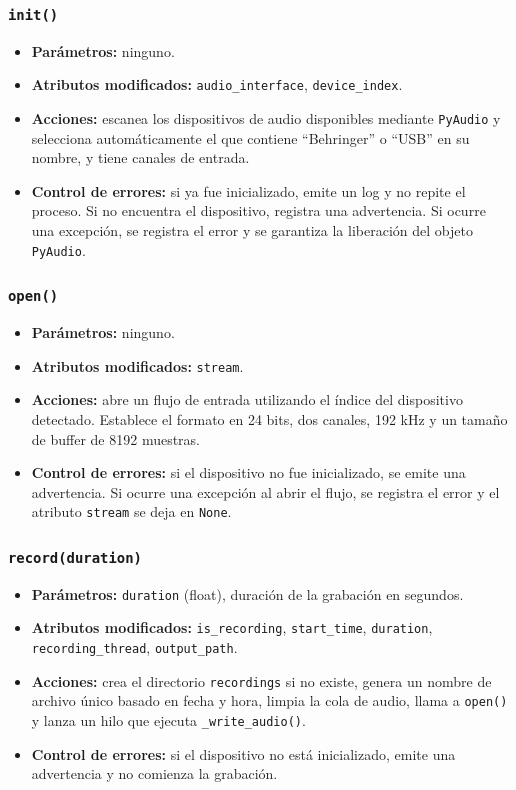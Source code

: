\subsubsection*{\texttt{init()}}

\begin{itemize}
    \item \textbf{Parámetros:} ninguno.
    \item \textbf{Atributos modificados:} \texttt{audio\_interface}, \texttt{device\_index}.
    \item \textbf{Acciones:} escanea los dispositivos de audio disponibles mediante \texttt{PyAudio} y selecciona automáticamente el que contiene ``Behringer'' o ``USB'' en su nombre, y tiene canales de entrada.
    \item \textbf{Control de errores:} si ya fue inicializado, emite un log y no repite el proceso. Si no encuentra el dispositivo, registra una advertencia. Si ocurre una excepción, se registra el error y se garantiza la liberación del objeto \texttt{PyAudio}.
\end{itemize}

\subsubsection*{\texttt{open()}}

\begin{itemize}
    \item \textbf{Parámetros:} ninguno.
    \item \textbf{Atributos modificados:} \texttt{stream}.
    \item \textbf{Acciones:} abre un flujo de entrada utilizando el índice del dispositivo detectado. Establece el formato en 24 bits, dos canales, 192 kHz y un tamaño de buffer de 8192 muestras.
    \item \textbf{Control de errores:} si el dispositivo no fue inicializado, se emite una advertencia. Si ocurre una excepción al abrir el flujo, se registra el error y el atributo \texttt{stream} se deja en \texttt{None}.
\end{itemize}

\subsubsection*{\texttt{record(duration)}}

\begin{itemize}
    \item \textbf{Parámetros:} \texttt{duration} (float), duración de la grabación en segundos.
    \item \textbf{Atributos modificados:} \texttt{is\_recording}, \texttt{start\_time}, \texttt{duration}, \texttt{recording\_thread}, \texttt{output\_path}.
    \item \textbf{Acciones:} crea el directorio \texttt{recordings} si no existe, genera un nombre de archivo único basado en fecha y hora, limpia la cola de audio, llama a \texttt{open()} y lanza un hilo que ejecuta \texttt{\_write\_audio()}.
    \item \textbf{Control de errores:} si el dispositivo no está inicializado, emite una advertencia y no comienza la grabación.
\end{itemize}

